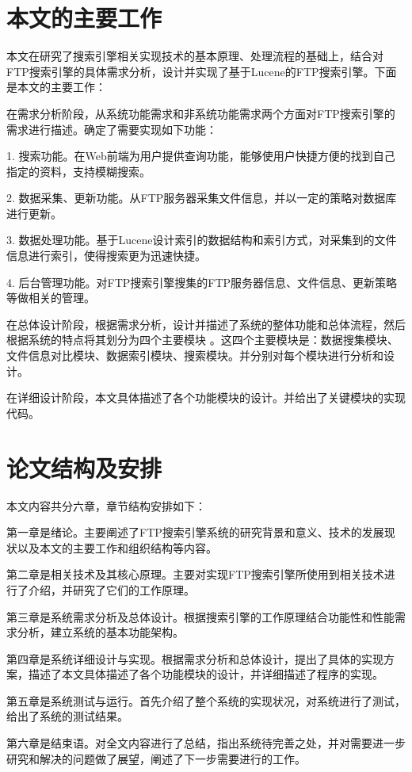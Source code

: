 \section{本文的主要工作}
本文在研究了搜索引擎相关实现技术的基本原理、处理流程的基础上，结合对FTP搜索引擎的具体需求分析，设计并实现了基于Lucene的FTP搜索引擎。下面是本文的主要工作：

在需求分析阶段，从系统功能需求和非系统功能需求两个方面对FTP搜索引擎的需求进行描述。确定了需要实现如下功能：

1. 搜索功能。在Web前端为用户提供查询功能，能够使用户快捷方便的找到自己指定的资料，支持模糊搜索。

2. 数据采集、更新功能。从FTP服务器采集文件信息，并以一定的策略对数据库进行更新。

3. 数据处理功能。基于Lucene设计索引的数据结构和索引方式，对采集到的文件信息进行索引，使得搜索更为迅速快捷。

4. 后台管理功能。对FTP搜索引擎搜集的FTP服务器信息、文件信息、更新策略等做相关的管理。

在总体设计阶段，根据需求分析，设计并描述了系统的整体功能和总体流程，然后根据系统的特点将其划分为四个主要模块 。这四个主要模块是：数据搜集模块、文件信息对比模块、数据索引模块、搜索模块。并分别对每个模块进行分析和设计。

在详细设计阶段，本文具体描述了各个功能模块的设计。并给出了关键模块的实现代码。
\section{论文结构及安排}
本文内容共分六章，章节结构安排如下：

第一章是绪论。主要阐述了FTP搜索引擎系统的研究背景和意义、技术的发展现状以及本文的主要工作和组织结构等内容。

第二章是相关技术及其核心原理。主要对实现FTP搜索引擎所使用到相关技术进行了介绍，并研究了它们的工作原理。

第三章是系统需求分析及总体设计。根据搜索引擎的工作原理结合功能性和性能需求分析，建立系统的基本功能架构。

第四章是系统详细设计与实现。根据需求分析和总体设计，提出了具体的实现方案，描述了本文具体描述了各个功能模块的设计，并详细描述了程序的实现。

第五章是系统测试与运行。首先介绍了整个系统的实现状况，对系统进行了测试，给出了系统的测试结果。

第六章是结束语。对全文内容进行了总结，指出系统待完善之处，并对需要进一步研究和解决的问题做了展望，阐述了下一步需要进行的工作。
